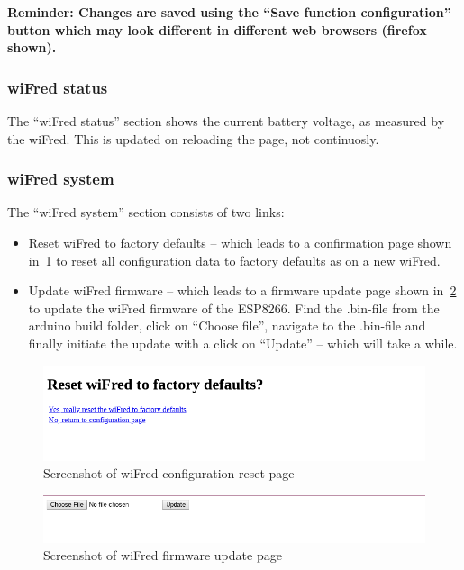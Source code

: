 \documentclass[11pt,a4paper]{scrartcl}
\begin{document}
\textbf{Reminder: Changes are saved using the ``Save function configuration'' button which may look different in different web browsers (firefox shown).}

\subsubsection{wiFred status}

The ``wiFred status'' section shows the current battery voltage, as measured by the wiFred. This is updated on reloading the page, not continuosly.

\subsubsection{wiFred system}

The ``wiFred system'' section consists of two links:

\begin{itemize}
\item Reset wiFred to factory defaults -- which leads to a confirmation page shown in~\ref{throttleConfResetPage} to reset all configuration data to factory defaults as on a new wiFred.
\item Update wiFred firmware -- which leads to a firmware update page shown in~\ref{throttleConfUpdatePage} to update the wiFred firmware of the ESP8266. Find the .bin-file from the arduino build folder, click on ``Choose file'', navigate to the .bin-file and finally initiate the update with a click on ``Update'' -- which will take a while.
\end{itemize}

\begin{figure}[tbh]
  \centering
  \includegraphics[width=0.8 \textwidth]{images/wiFred_reset_page}
  \caption{Screenshot of wiFred configuration reset page}
  \label{throttleConfResetPage}
\end{figure}

\begin{figure}[tbh]
  \centering
  \includegraphics[width=0.8 \textwidth]{images/wiFred_update_page}
  \caption{Screenshot of wiFred firmware update page}
  \label{throttleConfUpdatePage}
\end{figure}
\end{document}
